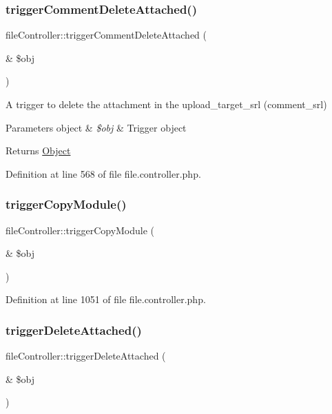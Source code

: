 \subsubsection{\texorpdfstring{trigger\+Comment\+Delete\+Attached()}{triggerCommentDeleteAttached()}}
{\footnotesize\ttfamily file\+Controller\+::trigger\+Comment\+Delete\+Attached (\begin{DoxyParamCaption}\item[{\&}]{\$obj }\end{DoxyParamCaption})}

A trigger to delete the attachment in the upload\+\_\+target\+\_\+srl (comment\+\_\+srl)


\begin{DoxyParams}[1]{Parameters}
object & {\em \$obj} & Trigger object \\
\hline
\end{DoxyParams}
\begin{DoxyReturn}{Returns}
\hyperlink{classObject}{Object} 
\end{DoxyReturn}


Definition at line 568 of file file.\+controller.\+php.

\mbox{\label{classfileController_a043759003f14e91db0f4fb554955fba8}} 
\subsubsection{\texorpdfstring{trigger\+Copy\+Module()}{triggerCopyModule()}}
{\footnotesize\ttfamily file\+Controller\+::trigger\+Copy\+Module (\begin{DoxyParamCaption}\item[{\&}]{\$obj }\end{DoxyParamCaption})}



Definition at line 1051 of file file.\+controller.\+php.

\mbox{\label{classfileController_aaa8d73e09e5aa3a5a6807dffb578d84c}} 
\subsubsection{\texorpdfstring{trigger\+Delete\+Attached()}{triggerDeleteAttached()}}
{\footnotesize\ttfamily file\+Controller\+::trigger\+Delete\+Attached (\begin{DoxyParamCaption}\item[{\&}]{\$obj }\end{DoxyParamCaption})}

